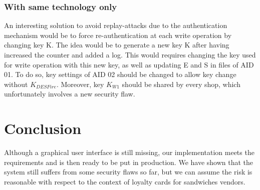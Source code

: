\documentclass[a4paper,11pt,oneside]{article}
\begin{document}
\subsubsection{With same technology only}

An interesting solution to avoid replay-attacks due to the authentication mechanism would be to force re-authentication at each write operation by changing key K. The idea would be to generate a new key K after having increased the counter and added a log. This would requires changing the key used for write operation with this new key, as well as updating E and S in files of AID 01. To do so, key settings of AID 02 should be changed to allow key change without $K_{DESFire}$. Moreover, key $K_{W1}$ should be shared by every shop, which unfortunately involves a new security flaw. 

\section{Conclusion}

Although a graphical user interface is still missing, our implementation meets the requirements and is then ready to be put in production. We have shown that the system  still suffers from some security flaws so far, but we can assume the risk is reasonable with respect to the context of loyalty cards for sandwiches vendors. 
\end{document}
